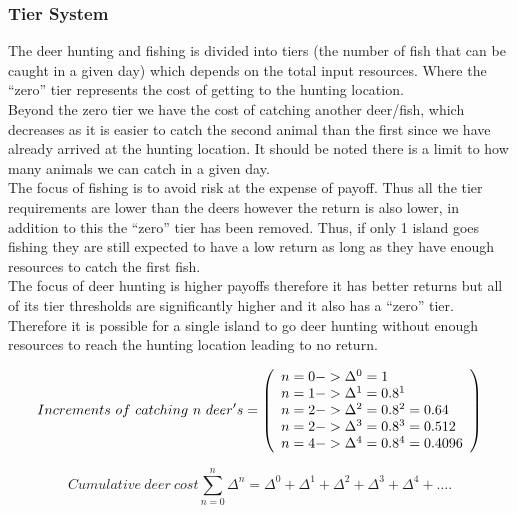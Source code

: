 \newpage
\subsubsection{Tier System}

The deer hunting and fishing is divided into tiers (the number of fish that can be caught in a given day) which depends on the total input resources. Where the “zero” tier represents the cost of getting to the hunting location.\\ 

Beyond the zero tier we have the cost of catching another deer/fish, which decreases as it is easier to catch the second animal than the first since we have already arrived at the hunting location. It should be noted there is a limit to how many animals we can catch in a given day.\\

The focus of fishing is to avoid risk at the expense of payoff. Thus all the tier requirements are lower than the deers however the return is also lower, in addition to this the “zero” tier has been removed. Thus, if only 1 island goes fishing they are still expected to have a low return as long as they have enough resources to catch the first fish. \\

The focus of deer hunting is higher payoffs therefore it has better returns but all of its tier thresholds are significantly higher and it also has a “zero” tier. Therefore it is possible for a single island to go deer hunting without enough resources to reach the hunting location leading to no return.

\begin{equation}
Increments\ of\ catching\ n\ deer's=
\left( \begin{array}{ll@{}}
n=0 -> \Delta^0 = 1 \\
n=1 -> \Delta^1 = 0.8^1 \\
n=2 -> \Delta^2 = 0.8^2 = 0.64 \\
n=2 -> \Delta^3 = 0.8^3 = 0.512 \\
n=4 -> \Delta^4 = 0.8^4 = 0.4096\\
\end{array} \right) 
\end{equation}

\begin{equation}
Cumulative\ deer \ cost \sum_{n=0}^{n} \Delta^{n} = \Delta^{0} + \Delta^{1} + \Delta^{2} + \Delta^{3} + \Delta^{4} + ....
\end{equation}

